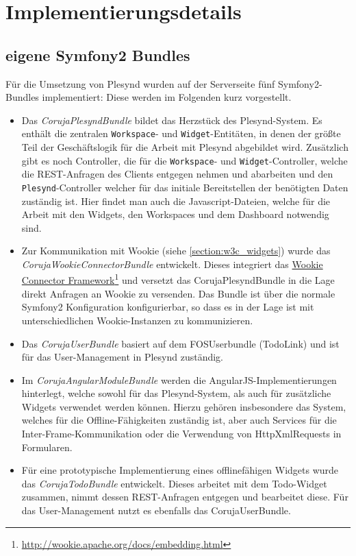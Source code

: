 \section{Implementierungsdetails}\label{section:implementierungsdetails}

\subsection{eigene Symfony2 Bundles}\label{section:backend}
Für die Umsetzung von Plesynd wurden auf der Serverseite fünf Symfony2-Bundles implementiert: Diese werden im Folgenden kurz vorgestellt.

\begin{itemize}
\item Das \emph{CorujaPlesyndBundle} bildet das Herzstück des Plesynd-System. Es enthält die zentralen \texttt{Workspace}- und \texttt{Widget}-Entitäten, in denen der größte Teil der Geschäftslogik für die Arbeit mit Plesynd abgebildet wird. Zusätzlich gibt es noch Controller, die für die \texttt{Workspace}- und \texttt{Widget}-Controller, welche die REST-Anfragen des Clients entgegen nehmen und abarbeiten und den \texttt{Plesynd}-Controller welcher für das initiale Bereitstellen der benötigten Daten zuständig ist. Hier findet man auch die Javascript-Dateien, welche für die Arbeit mit den Widgets, den Workspaces und dem Dashboard notwendig sind.
\item Zur Kommunikation mit Wookie (siehe \ref{section:w3c_widgets}) wurde das \emph{CorujaWookieConnectorBundle} entwickelt. Dieses integriert das \href{http://wookie.apache.org/docs/embedding.html}{Wookie Connector Framework}\footnote{\url{http://wookie.apache.org/docs/embedding.html}} und versetzt das CorujaPlesyndBundle in die Lage direkt Anfragen an Wookie zu versenden. Das Bundle ist über die normale Symfony2 Konfiguration konfigurierbar, so dass es in der Lage ist mit unterschiedlichen Wookie-Instanzen zu kommunizieren.
\item Das \emph{CorujaUserBundle} basiert auf dem FOSUserbundle (TodoLink) und ist für das User-Management in Plesynd zuständig.
\item Im \emph{CorujaAngularModuleBundle} werden die AngularJS-Implementierungen hinterlegt, welche sowohl für das Plesynd-System, als auch für zusätzliche Widgets verwendet werden können. Hierzu gehören insbesondere das System, welches für die Offline-Fähigkeiten zuständig ist, aber auch Services für die Inter-Frame-Kommunikation oder die Verwendung von HttpXmlRequests in Formularen.  
\item Für eine prototypische Implementierung eines offlinefähigen Widgets wurde das \emph{CorujaTodoBundle} entwickelt. Dieses arbeitet mit dem Todo-Widget zusammen, nimmt dessen REST-Anfragen entgegen und bearbeitet diese. Für das User-Management nutzt es ebenfalls das CorujaUserBundle.
\end{itemize}

